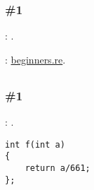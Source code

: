 \subsubsection{\Exercise \#1}
\label{exercise_solutions_obfuscation_1}

\Exercise: .

: \href{http://go.yurichev.com/17162}{beginners.re}.

\subsection{}

\subsubsection{\Exercise \#1}
\label{exercise_solutions_arith_optimizations_1}

\Exercise: .

\begin{lstlisting}
int f(int a)
{
	return a/661;
};
\end{lstlisting}
